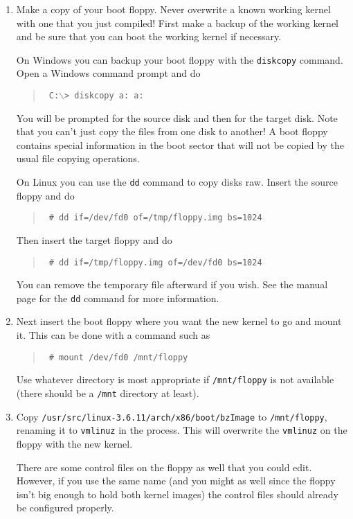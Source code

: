 \documentclass{article}
\newcommand{\command}[1]{\texttt{#1}}    %
\newcommand{\filename}[1]{\texttt{#1}}   %
\newenvironment{commands}
  {\begin{quote} \tt}
  {\end{quote}}
\begin{document}
\begin{enumerate}

\item Make a copy of your boot floppy. Never overwrite a known working kernel with one that you
  just compiled! First make a backup of the working kernel and be sure that you can boot the
  working kernel if necessary.

  On Windows you can backup your boot floppy with the \command{diskcopy} command. Open a Windows
  command prompt and do

\begin{commands}
C:$\backslash$> diskcopy a: a:
\end{commands}

You will be prompted for the source disk and then for the target disk. Note that you can't just
copy the files from one disk to another! A boot floppy contains special information in the boot
sector that will not be copied by the usual file copying operations.

On Linux you can use the \command{dd} command to copy disks raw. Insert the source floppy and do
\begin{commands}
\# dd if=/dev/fd0 of=/tmp/floppy.img bs=1024
\end{commands}

Then insert the target floppy and do
\begin{commands}
\# dd if=/tmp/floppy.img of=/dev/fd0 bs=1024
\end{commands}

You can remove the temporary file afterward if you wish. See the manual page for the
\command{dd} command for more information.

\item Next insert the boot floppy where you want the new kernel to go and mount it. This can be
  done with a command such as
\begin{commands}
\# mount /dev/fd0 /mnt/floppy
\end{commands}

Use whatever directory is most appropriate if \filename{/mnt/floppy} is not available (there
should be a \filename{/mnt} directory at least).

\item Copy \filename{/usr/src/linux-3.6.11/arch/x86/boot/bzImage} to \filename{/mnt/floppy},
  renaming it to \filename{vmlinuz} in the process. This will overwrite the \filename{vmlinuz}
  on the floppy with the new kernel.

  There are some control files on the floppy as well that you could edit. However, if you use
  the same name (and you might as well since the floppy isn't big enough to hold both kernel
  images) the control files should already be configured properly.


\end{enumerate}
\end{document}
